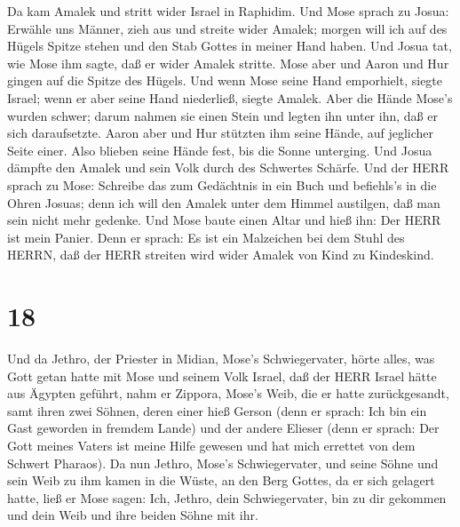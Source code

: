  Da kam Amalek und stritt wider Israel in Raphidim.
 Und Mose sprach zu Josua: Erwähle uns Männer, zieh aus und
streite wider Amalek; morgen will ich auf des Hügels Spitze stehen und
den Stab Gottes in meiner Hand haben.  Und Josua tat, wie
Mose ihm sagte, daß er wider Amalek stritte. Mose aber und Aaron und Hur
gingen auf die Spitze des Hügels.  Und wenn Mose seine Hand
emporhielt, siegte Israel; wenn er aber seine Hand niederließ, siegte
Amalek.  Aber die Hände Mose's wurden schwer; darum nahmen
sie einen Stein und legten ihn unter ihn, daß er sich daraufsetzte.
Aaron aber und Hur stützten ihm seine Hände, auf jeglicher Seite einer.
Also blieben seine Hände fest, bis die Sonne unterging. 
Und Josua dämpfte den Amalek und sein Volk durch des Schwertes Schärfe.
 Und der HERR sprach zu Mose: Schreibe das zum Gedächtnis
in ein Buch und befiehls's in die Ohren Josuas; denn ich will den Amalek
unter dem Himmel austilgen, daß man sein nicht mehr gedenke.
 Und Mose baute einen Altar und hieß ihn: Der HERR ist mein
Panier.  Denn er sprach: Es ist ein Malzeichen bei dem
Stuhl des HERRN, daß der HERR streiten wird wider Amalek von Kind zu
Kindeskind.

\hypertarget{section-17}{%
\section{18}\label{section-17}}

 Und da Jethro, der Priester in Midian, Mose's
Schwiegervater, hörte alles, was Gott getan hatte mit Mose und seinem
Volk Israel, daß der HERR Israel hätte aus Ägypten geführt, 
nahm er Zippora, Mose's Weib, die er hatte zurückgesandt, 
samt ihren zwei Söhnen, deren einer hieß Gerson (denn er sprach: Ich bin
ein Gast geworden in fremdem Lande)  und der andere Elieser
(denn er sprach: Der Gott meines Vaters ist meine Hilfe gewesen und hat
mich errettet von dem Schwert Pharaos).  Da nun Jethro,
Mose's Schwiegervater, und seine Söhne und sein Weib zu ihm kamen in die
Wüste, an den Berg Gottes, da er sich gelagert hatte,  ließ
er Mose sagen: Ich, Jethro, dein Schwiegervater, bin zu dir gekommen und
dein Weib und ihre beiden Söhne mit ihr.

